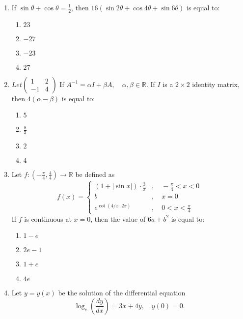 \documentclass[journal]{IEEEtran}
\numberwithin{figure}{enumi}
\begin{document}
\begin{enumerate}
\item If $\sin\theta+\cos\theta=\frac{1}{2}$, then $16(\sin2\theta+\cos4\theta+\sin6\theta)$ is equal to:
\begin{enumerate}
    \item $23$
    \item $-27$
    \item $-23$
    \item $27$
\end{enumerate}
  \item $Let \begin{pmatrix}
      1 & 2\\
      -1 & 4
  \end{pmatrix}$
      If $ A^{-1} = \alpha I + \beta A, \quad \alpha, \beta \in \mathbb{R} $. If $ I $ is a $ 2 \times 2 $ identity matrix, then $ 4(\alpha - \beta) $ is equal to:
    \begin{enumerate}
        \item $ 5 $
        \item $ \frac{8}{3} $
        \item $ 2 $
        \item $ 4 $
    \end{enumerate}
\item Let $ f: \left(-\frac{\pi}{4}, \frac{4}{4}\right) \to \mathbb{R} $ be defined as
\begin{equation*}
       f(x) =
    \begin{cases}
        (1 + |\sin x|) \cdot \frac{3}{\pi} & , \quad -\frac{\pi}{4} < x < 0 \\
        b & , \quad x = 0 \\
        e^{\cot(4/x \cdot 2x)} & , \quad 0 < x < \frac{\pi}{4}
    \end{cases}
  \end{equation*}
    If $ f $ is continuous at $ x = 0 $, then the value of $ 6a + b^2 $ is equal to:
    \begin{enumerate}
        \item $ 1 - e $
        \item $ 2e - 1 $
        \item $ 1 + e $
        \item $ 4e $
    \end{enumerate}
 \item Let $y = y(x)$ be the solution of the differential equation 
    \begin{equation*}
    \log_e\left(\frac{dy}{dx}\right) = 3x + 4y, \quad y(0) = 0.
    \end{equation*}

\end{enumerate}
\end{document}
